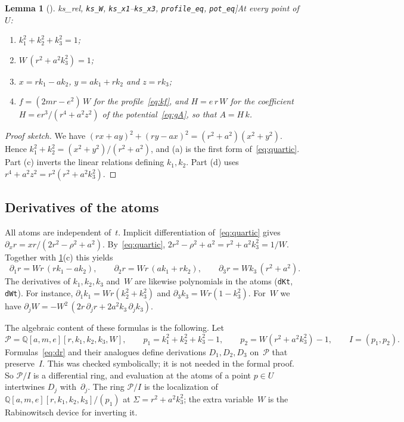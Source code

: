 \documentclass[11pt]{article}
\newtheorem{lemma}[theorem]{Lemma}
\theoremstyle{definition}
\theoremstyle{remark}
\newcommand{\Q}{\mathbb{Q}}
\newcommand{\lean}[1]{\lstinline[basicstyle=\ttfamily\normalsize,columns=fullflexible,breaklines=false]{#1}}
\begin{document}
\begin{lemma}[\lean{ks_rel}, \lean{ks_W}, \lean{ks_x1}--\lean{ks_x3}, \lean{profile_eq}, \lean{pot_eq}]\label{lem:atoms}
At every point of $U$:
\begin{enumerate}[label=(\alph*)]
  \item $k_1^2+k_2^2+k_3^2=1$;
  \item $W\,(r^2+a^2k_3^2)=1$;
  \item $x=rk_1-ak_2$, $y=ak_1+rk_2$ and $z=rk_3$;
  \item $f=(2mr-e^2)\,W$ for the profile~\eqref{eq:kf}, and $H=e\,r\,W$ for the coefficient $H=er^3/(r^4+a^2z^2)$ of the potential~\eqref{eq:gA}, so that $A=H\,k$.
\end{enumerate}
\end{lemma}
\begin{proof}[Proof sketch]
We have $(rx+ay)^2+(ry-ax)^2=(r^2+a^2)(x^2+y^2)$.
Hence $k_1^2+k_2^2=(x^2+y^2)/(r^2+a^2)$, and (a) is the first form of~\eqref{eq:quartic}.
Part (c) inverts the linear relations defining $k_1,k_2$.
Part (d) uses $r^4+a^2z^2=r^2(r^2+a^2k_3^2)$.
\end{proof}

\subsection{Derivatives of the atoms}

All atoms are independent of~$t$.
Implicit differentiation of~\eqref{eq:quartic} gives $\partial_x r = xr/(2r^2-\rho^2+a^2)$.
By~\eqref{eq:quartic}, $2r^2-\rho^2+a^2 = r^2+a^2k_3^2 = 1/W$.
Together with \cref{lem:atoms}(c) this yields
\begin{equation}\label{eq:dr}
  \partial_1 r = W r\,(rk_1-ak_2),\qquad
  \partial_2 r = W r\,(ak_1+rk_2),\qquad
  \partial_3 r = W k_3\,(r^2+a^2).
\end{equation}
The derivatives of $k_1,k_2,k_3$ and~$W$ are likewise polynomials in the atoms (\lean{dKt}, \lean{dWt}).
For instance, $\partial_1 k_1=Wr(k_2^2+k_3^2)$ and $\partial_3 k_3 = Wr(1-k_3^2)$.
For~$W$ we have $\partial_j W=-W^2\,(2r\,\partial_j r+2a^2k_3\,\partial_j k_3)$.

The algebraic content of these formulas is the following.
Let
\[
  \mathcal{P}=\Q[a,m,e][r,k_1,k_2,k_3,W],\qquad
  p_1=k_1^2+k_2^2+k_3^2-1,\qquad
  p_2=W(r^2+a^2k_3^2)-1,\qquad
  I=(p_1,p_2).
\]
Formulas~\eqref{eq:dr} and their analogues define derivations $D_1,D_2,D_3$ on~$\mathcal P$ that preserve~$I$.
This was checked symbolically; it is not needed in the formal proof.
So $\mathcal P/I$ is a differential ring, and evaluation at the atoms of a point $p\in U$ intertwines $D_j$ with~$\partial_j$.
The ring $\mathcal P/I$ is the localization of $\Q[a,m,e][r,k_1,k_2,k_3]/(p_1)$ at $\Sigma=r^2+a^2k_3^2$; the extra variable~$W$ is the Rabinowitsch device for inverting it.
\end{document}
